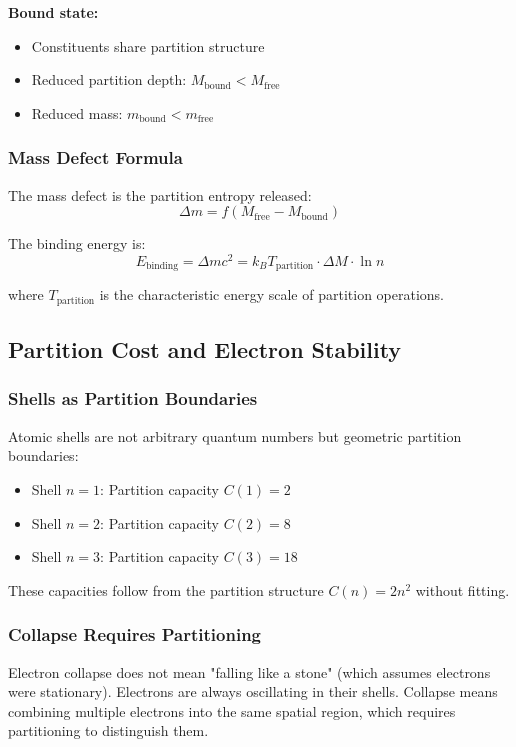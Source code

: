 \documentclass[12pt,a4paper]{article}
\begin{document}
\textbf{Bound state:}
\begin{itemize}
\item Constituents share partition structure
\item Reduced partition depth: $M_{\text{bound}} < M_{\text{free}}$
\item Reduced mass: $m_{\text{bound}} < m_{\text{free}}$
\end{itemize}

\subsubsection{Mass Defect Formula}

The mass defect is the partition entropy released:
$$
\Delta m = f(M_{\text{free}} - M_{\text{bound}})
$$

The binding energy is:
$$
E_{\text{binding}} = \Delta m c^2 = k_B T_{\text{partition}} \cdot \Delta M \cdot \ln n
$$

where $T_{\text{partition}}$ is the characteristic energy scale of partition operations.

\subsection{Partition Cost and Electron Stability}

\subsubsection{Shells as Partition Boundaries}

Atomic shells are not arbitrary quantum numbers but geometric partition boundaries:

\begin{itemize}
\item Shell $n=1$: Partition capacity $C(1) = 2$
\item Shell $n=2$: Partition capacity $C(2) = 8$
\item Shell $n=3$: Partition capacity $C(3) = 18$
\end{itemize}

These capacities follow from the partition structure $C(n) = 2n^2$ without fitting.

\subsubsection{Collapse Requires Partitioning}

Electron collapse does not mean "falling like a stone" (which assumes electrons were stationary). Electrons are always oscillating in their shells. Collapse means combining multiple electrons into the same spatial region, which requires partitioning to distinguish them.
\end{document}
